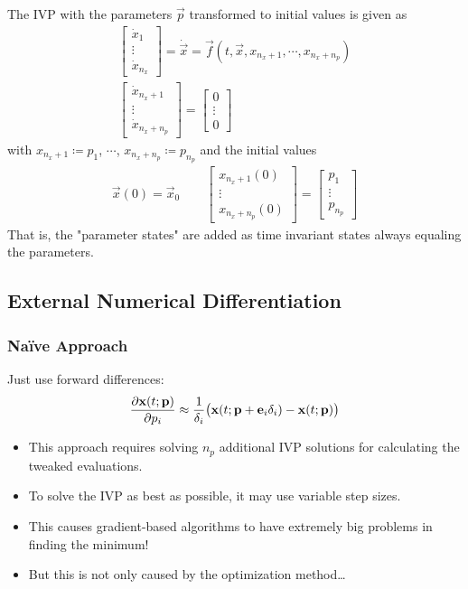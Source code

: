 			The IVP with the parameters \(\vec{p}\) transformed to initial values is given as
			\begin{align*}
				\begin{bmatrix}
					\dot{x}_1 \\
					\vdots \\
					\dot{x}_{n_x}
				\end{bmatrix}
				= \dot{\vec{x}} = \vec{f}(t, \vec{x}, x_{n_x + 1}, \cdots, x_{n_x + n_p}) \\
				\begin{bmatrix}
					\dot{x}_{n_x + 1} \\
					\vdots \\
					\dot{x}_{n_x + n_p}
				\end{bmatrix}
				=
				\begin{bmatrix}
					0 \\
					\vdots \\
					0
				\end{bmatrix}
			\end{align*}
			with \( x_{n_x + 1} \coloneqq p_1 \), \( \cdots \), \( x_{n_x + n_p} \coloneqq p_{n_p} \) and the initial values
			\begin{align*}
				\vec{x}(0) = \vec{x}_0 \qquad
				\begin{bmatrix}
					x_{n_x + 1}(0) \\
					\vdots \\
					x_{n_x + n_p}(0)
				\end{bmatrix}
				=
				\begin{bmatrix}
					p_1 \\
					\vdots \\
					p_{n_p}
				\end{bmatrix}
			\end{align*}
			That is, the "parameter states" are added as time invariant states always equaling the parameters.

		\subsection{External Numerical Differentiation}
			\subsubsection{Na{\"i}ve Approach} %
				Just use forward differences:
				\begin{align*}
					\pdv{\boldsymbol{\mathrm{x}}(t; \boldsymbol{\mathrm{p}})}{p_i} \approx \frac{1}{\delta_i} \big( \boldsymbol{\mathrm{x}}(t; \boldsymbol{\mathrm{p}} + \boldsymbol{\mathrm{e}}_i \delta_i) - \boldsymbol{\mathrm{x}}(t; \boldsymbol{\mathrm{p}}) \big)
				\end{align*}
				\begin{itemize}
					\item This approach requires solving \(n_p\) additional IVP solutions for calculating the tweaked evaluations.
					\item To solve the IVP as best as possible, it may use variable step sizes.
					\item This causes gradient-based algorithms to have extremely big problems in finding the minimum!
					\item But this is not only caused by the optimization method\dots
				\end{itemize}
			
